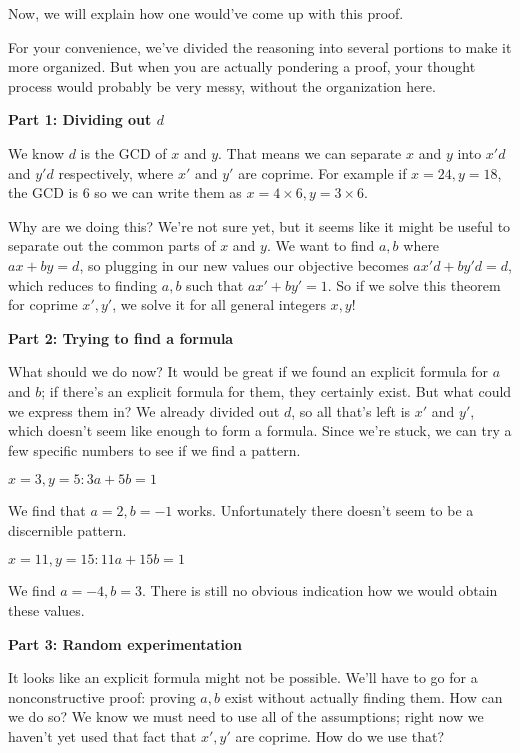 \documentclass[11pt]{article}
\begin{document}
    Now, we will explain how one would've come up with this proof.
    
    
    For your convenience, we've divided the reasoning into several portions to make it
    more organized. But when you are actually pondering a proof, your thought process
    would probably be very messy, without the organization here.
    
    \textbf{Part 1: Dividing out $d$}
    
    We know $d$ is the GCD of $x$ and $y$. That means we can separate $x$ and $y$ into
    $x'd$ and $y'd$ respectively, where $x'$ and $y'$ are coprime. For example if
    $x=24,y=18$, the GCD is 6 so we can write them as $x=4\times6,y=3\times6$.
    
    Why are we doing this? We're not sure yet, but it seems like it might be useful
    to separate out the common parts of $x$ and $y$. We want to find $a,b$ where 
    $ax+by=d$, so plugging in our new values our objective becomes $ax'd+by'd=d$,
    which reduces to finding $a,b$ such that $ax'+by'=1$. So if we solve this
    theorem for coprime $x',y'$, we solve it for all general integers $x,y$!
    
    \textbf{Part 2: Trying to find a formula}
    
    What should we do now? It would be great if we found an explicit formula for $a$ and
    $b$; if there's an explicit formula for them, they certainly exist. But what could we
    express them in? We already divided out $d$, so all that's left is $x'$ and $y'$,
    which doesn't seem like enough to form a formula. Since we're stuck, we can try a few
    specific numbers to see if we find a pattern.
    
    $x=3,y=5: 3a+5b=1$
    
    We find that $a=2,b=-1$ works. Unfortunately there doesn't seem to be a discernible
    pattern.
    
    $x=11,y=15: 11a+15b=1$
    
    We find $a=-4,b=3$. There is still no obvious indication how we would obtain these 
    values.
    
    \textbf{Part 3: Random experimentation}
    
    It looks like an explicit formula might not be possible. We'll have to go for a
    nonconstructive proof: proving $a,b$ exist without actually finding them. How can
    we do so? We know we must need to use all of the assumptions; right now we haven't
    yet used that fact that $x',y'$ are coprime. How do we use that?
    
\end{document}
